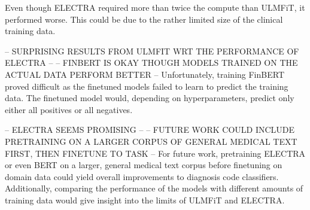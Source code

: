 Even though ELECTRA required more than twice the compute than ULMFiT, it performed worse.
This could be due to the rather limited size of the clinical training data.

-- SURPRISING RESULTS FROM ULMFIT WRT THE PERFORMANCE OF ELECTRA --
-- FINBERT IS OKAY THOUGH MODELS TRAINED ON THE ACTUAL DATA PERFORM BETTER --
Unfortunately, training FinBERT proved difficult as the finetuned models failed to learn to predict the training data.
The finetuned model would, depending on hyperparameters, predict only either all positives or all negatives.

-- ELECTRA SEEMS PROMISING --
-- FUTURE WORK COULD INCLUDE PRETRAINING ON A LARGER CORPUS OF GENERAL MEDICAL TEXT FIRST, THEN FINETUNE TO TASK --
For future work, pretraining ELECTRA or even BERT on a larger, general medical text corpus before finetuning on domain data could yield overall improvements to diagnosis code classifiers.
Additionally, comparing the performance of the models with different amounts of training data would give insight into the limits of ULMFiT and ELECTRA.
